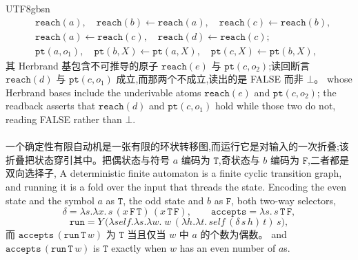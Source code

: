 \begin{CJK*}{UTF8}{gbsn}
  \[
    \begin{aligned}
      &\mathtt{reach}(a),\quad \mathtt{reach}(b)\leftarrow\mathtt{reach}(a),\quad
      \mathtt{reach}(c)\leftarrow\mathtt{reach}(b),\\
      &\mathtt{reach}(a)\leftarrow\mathtt{reach}(c),\quad \mathtt{reach}(d)\leftarrow\mathtt{reach}(c);\\
      &\mathtt{pt}(a,o_1),\quad \mathtt{pt}(b,X)\leftarrow\mathtt{pt}(a,X),\quad
      \mathtt{pt}(c,X)\leftarrow\mathtt{pt}(b,X),
    \end{aligned}
  \]
  \ifPaperChinese
  其 Herbrand 基包含不可推导的原子 $\mathtt{reach}(e)$ 与 $\mathtt{pt}(c,o_2)$;读回断言 $\mathtt{reach}(d)$ 与 $\mathtt{pt}(c,o_1)$ 成立,而那两个不成立,读出的是 FALSE 而非 $\bot$。
  \else
  whose Herbrand bases include the underivable atoms $\mathtt{reach}(e)$ and $\mathtt{pt}(c,o_2)$; the readback asserts that $\mathtt{reach}(d)$ and $\mathtt{pt}(c,o_1)$ hold while those two do not, reading FALSE rather than $\bot$.
  \fi

  \paragraph{}
  \ifPaperChinese 一个确定性有限自动机是一张有限的环状转移图,而运行它是对输入的一次折叠;该折叠把状态穿引其中。把偶状态与符号 $a$ 编码为 $\mathtt{T}$,奇状态与 $b$ 编码为 $\mathtt{F}$,二者都是双向选择子, \else A deterministic finite automaton is a finite cyclic transition graph, and running it is a fold over the input that threads the state. Encoding the even state and the symbol $a$ as $\mathtt{T}$, the odd state and $b$ as $\mathtt{F}$, both two-way selectors, \fi
  \[
    \delta = \lambda s.\lambda x.\,s\,(x\,\mathtt{F}\,\mathtt{T})\,(x\,\mathtt{T}\,\mathtt{F}), \qquad
    \mathtt{accepts} = \lambda s.\,s\,\mathtt{T}\,\mathtt{F},
  \]
  \[
    \mathtt{run} = Y\,\big(\lambda\mathit{self}.\lambda s.\lambda w.\;
    w\,(\lambda h.\lambda t.\,\mathit{self}\,(\delta\,s\,h)\,t)\,s\big),
  \]
  \ifPaperChinese 而 $\mathtt{accepts}\,(\mathtt{run}\,\mathtt{T}\,w)$ 为 $\mathtt{T}$ 当且仅当 $w$ 中 $a$ 的个数为偶数。 \else and $\mathtt{accepts}\,(\mathtt{run}\,\mathtt{T}\,w)$ is $\mathtt{T}$ exactly when $w$ has an even number of $a$s. \fi


\end{CJK*}
